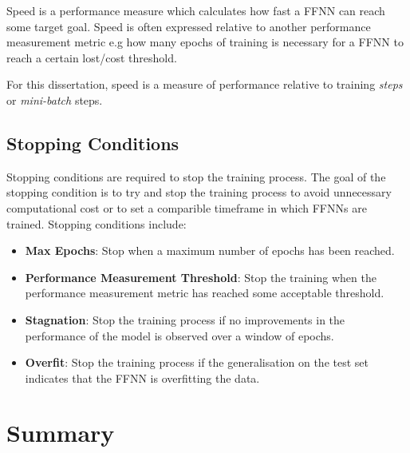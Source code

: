 Speed is a performance measure which calculates how fast a \ac{FFNN} can reach
some target goal. Speed is often expressed relative to another performance
measurement metric e.g how many epochs of training is necessary for a \ac{FFNN}
to reach a certain lost/cost threshold.

For this dissertation, speed is a measure of performance relative to training
\textit{steps} or \textit{mini-batch} steps.


\subsection{Stopping Conditions}
\label{sec:anns:training:stopping_conditions}

Stopping conditions are required to stop the training process. The goal of the
stopping condition is to try and stop the training process to avoid unnecessary
computational cost or to set a comparible timeframe in which \acp{FFNN} are
trained. Stopping conditions include:

\begin{itemize}
    \item
          \textbf{Max Epochs}: Stop when a maximum number of epochs has been reached.

    \item
          \textbf{Performance Measurement Threshold}: Stop the training when the
          performance measurement metric has reached some acceptable threshold.

    \item
          \textbf{Stagnation}: Stop the training process if no improvements in the
          performance of the model is observed over a window of epochs.

    \item
          \textbf{Overfit}: Stop the training process if the generalisation on the
          test set indicates that the \ac{FFNN} is overfitting the data.
\end{itemize}

\section{Summary}
\label{sec:anns:summary}

